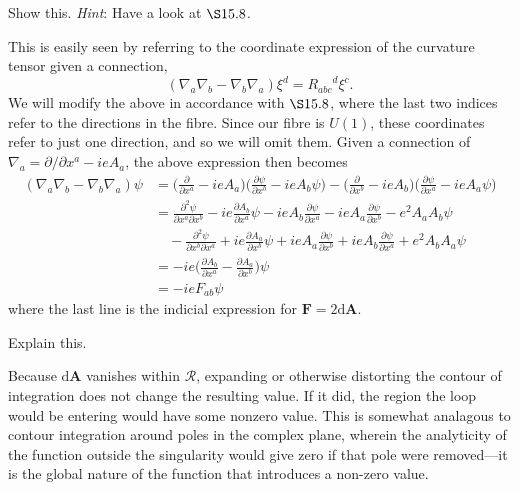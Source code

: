 \documentclass[../road-to-reality.tex]{subfiles}
\begin{document}
\begin{questions}
\question Show this. \textit{Hint}: Have a look at $\S15.8$.

  \begin{solution}
    This is easily seen by referring to the coordinate expression of the
    curvature tensor given a connection,
    \[
      (\nabla_a\nabla_b-\nabla_b\nabla_a)\xi^d = {R_{abc}}^d\xi^c.
    \]
    We will modify the above in accordance with $\S15.8$, where the last
    two indices refer to the directions in the fibre. Since our fibre is
    $U(1)$, these coordinates refer to just one direction, and so we will omit them.
    Given a connection of $\nabla_a=\partial/\partial{x}^a - ieA_a$, the above
    expression then becomes
    \begin{align*}
      (\nabla_a\nabla_b-\nabla_b\nabla_a)\psi &= \Big(\frac{\partial}{\partial{x}^a} - ieA_a\Big)\Big(\frac{\partial\psi}{\partial{x}^b} - ieA_b\psi\Big) - \Big(\frac{\partial}{\partial{x}^b} - ieA_b\Big)\Big(\frac{\partial\psi}{\partial{x}^a} - ieA_a\psi\Big) \\
                                              &= \frac{\partial^2\psi}{\partial{x}^a\partial{x}^b} - ie\frac{\partial{A_b}}{\partial{x}^a}\psi - ieA_b\frac{\partial{\psi}}{\partial{x}^a} - ieA_a\frac{\partial\psi}{\partial{x}^b} - e^2A_aA_b\psi \\
                                              &\quad - \frac{\partial^2\psi}{\partial{x}^b\partial{x}^a} + ie\frac{\partial{A_a}}{\partial{x}^b}\psi + ieA_a\frac{\partial{\psi}}{\partial{x}^b} + ieA_b\frac{\partial\psi}{\partial{x}^a} + e^2A_bA_a\psi \\
                                              &= -ie\Big(\frac{\partial{A_b}}{\partial{x}^a} - \frac{\partial{A_a}}{\partial{x}^b}\Big)\psi \\
                                              &= -ieF_{ab}\psi
    \end{align*}
    where the last line is the indicial expression for
    $\mathbf{F}=2\mathrm{d}\mathbf{A}$.
  \end{solution}

\question Explain this.

  \begin{solution}
    Because $\mathrm{d}\mathbf{A}$ vanishes within $\mathcal{R}$, expanding
    or otherwise distorting the contour of integration does not change the
    resulting value. If it did, the region the loop would be
    entering would have some nonzero value. This is somewhat analagous to
    contour integration around poles in the complex plane, wherein the analyticity of the
    function outside the singularity would give zero if that pole were removed---it is the global nature of 
    the function that introduces a non-zero value.
  \end{solution}


\end{questions}
\end{document}

